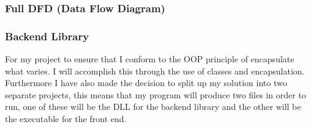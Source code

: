 \begin{FlushLeft}
    \subsubsection{Full DFD (Data Flow Diagram)}
    \begin{figure}[H]
        \centering
    \end{figure}

    \subsubsection{Backend Library}
    For my project to ensure that I conform to the OOP principle of encapsulate what varies. I will accomplish this through the use of classes and encapsulation. Furthermore I have also made the decision to split up my solution into two separate projects, this means that my program will produce two files in order to run, one of these will be the DLL for the backend library and the other will be the executable for the front end. \\ \bk


\end{FlushLeft}
